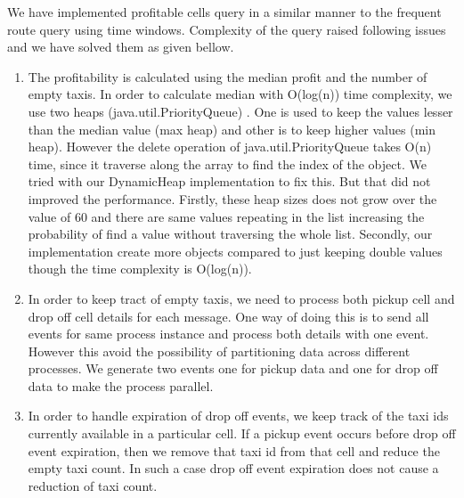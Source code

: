 We have implemented profitable cells query in a similar manner to the frequent route query using  time windows. Complexity of the query raised following issues and we have solved them as given bellow.
\begin{enumerate}
	\item The profitability is calculated using the median profit and the number of empty taxis. In order to calculate median with O(log(n)) time complexity, we use two heaps (java.util.PriorityQueue) . One is used to keep the values lesser than the median value (max heap) and other is to keep higher values (min heap). However the delete operation of java.util.PriorityQueue takes O(n) time, since it traverse along the array to find the index of the object. We tried with our DynamicHeap implementation to fix this. But that did not improved the performance. Firstly, these heap sizes does not grow over the value of 60 and there are same values repeating in the list increasing the probability of find a value without traversing the whole list. Secondly, our implementation create more objects compared to just keeping double values though the time complexity is O(log(n)). 
	\item In order to keep tract of empty taxis, we need to process both pickup cell and drop off cell details for each message. One way of doing this is to send all events for same process instance and process both details with one event. However this avoid the possibility of partitioning data across different processes. We generate two events one for pickup data and one for drop off data to make the process parallel. 
	\item In order to handle expiration of drop off events, we keep track of the taxi ids currently available in a particular cell. If a pickup event occurs before drop off event expiration, then we remove that taxi id from that cell and reduce the empty taxi count. In such a case drop off event expiration does not cause a reduction of taxi count.
\end{enumerate}






